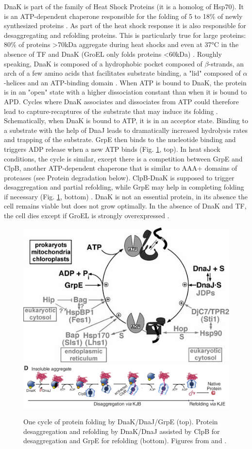 DnaK is part of the family of Heat Shock Proteins (it is a homolog of Hsp70). It is an ATP-dependent chaperone responsible for the folding of 5 to 18\% of newly synthesized proteins \citep{mayer_molecular_2000}. As part of the heat shock response it is also responsible for desaggregating and refolding proteins. This is particularly true for large proteins: 80\% of proteins >70kDa aggregate during heat shocks and even at 37°C in the absence of TF and DnaK (GroEL only folds proteins <60kDa) \citep{mayer_molecular_2000}. Roughly speaking, DnaK is composed of a hydrophobic pocket composed of $\beta$-strands, an arch of a few amino acids that facilitates substrate binding, a "lid" composed of $\alpha$-helices and an ATP-binding domain \citep{mayer_molecular_2000,mayer_hsp70_2005,castanie-cornet_chaperone_2014}. When ATP is bound to DnaK, the protein is in an "open" state with a higher dissociation constant than when it is bound to APD. Cycles where DnaK associates and dissociates from ATP could therefore lead to capture-recaptures of the substrate that may induce its folding \citep{mayer_molecular_2000}. Schematically, when DnaK is bound to ATP, it is in an acceptor state. Binding to a substrate with the help of DnaJ leads to dramatically increased hydrolysis rates and trapping of the substrate. GrpE then binds to the nucleotide binding and triggers ADP release when a new ATP binds (Fig. \ref{fig:dnaK}, top)\citep{mayer_hsp70_2005}. In heat shock conditions, the cycle is similar, except there is a competition between GrpE and ClpB, another ATP-dependent chaperone that is similar to AAA+ domains of proteases (see Protein degradation below). ClpB-DnaK is supposed to trigger desaggregation and partial refolding, while GrpE may help in completing folding if necessary (Fig. \ref{fig:dnaK}, bottom) \citep{rosenzweig_unraveling_2013}. DnaK is not an essential protein, in its absence the cell remains viable but does not grow optimally. In the absence of DnaK and TF, the cell dies except if GroEL is strongly overexpressed \citep{castanie-cornet_chaperone_2014}.

\begin{figure}[!ht]
	\centering
	\includegraphics[width=0.4\linewidth]{figure/dnaKJE}
	\includegraphics[width=0.8\linewidth]{figure/dnaKJB}
	\caption{One cycle of protein folding by DnaK/DnaJ/GrpE (top). Protein desaggregation and refolding by DnaK/DnaJ assisted by ClpB for desaggregation and GrpE for refolding (bottom). Figures from \citet{mayer_hsp70_2005} and \citet{rosenzweig_unraveling_2013}.}
	\label{fig:dnaK}	
\end{figure}

